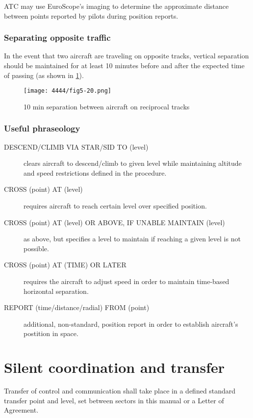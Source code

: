 ATC may use EuroScope's imaging to determine the approximate distance between
points reported by pilots during position reports.

\subsubsection{Separating opposite traffic}

In the event that two aircraft are traveling on opposite tracks, vertical
separation should be maintained for at least 10 minutes before and after the
expected time of passing (as shown in \cref{fig:separation:opposite}).

\begin{figure}[htbp]
  \centering
  \texttt{[image: 4444/fig5-20.png]}
  \caption{10 min separation between aircraft on reciprocal tracks~\cite{4444}}
  \label{fig:separation:opposite}
\end{figure}

\subsubsection{Useful phraseology}

\begin{description}
\item[DESCEND/CLIMB VIA STAR/SID TO (level)] clears aircraft to descend/climb to
  given level while maintaining altitude and speed restrictions defined in the
  procedure.
\item[CROSS (point) AT (level)] requires aircraft to reach certain level over
  specified position.
\item[CROSS (point) AT (level) OR ABOVE, IF UNABLE MAINTAIN (level)] as above,
  but specifies a level to maintain if reaching a given level is not possible.
\item[CROSS (point) AT (TIME) OR LATER] requires the aircraft to adjust speed in
  order to maintain time-based horizontal separation.
\item[REPORT (time/distance/radial) FROM (point)] additional, non-standard,
  position report in order to establish aircraft's postition in space.
\end{description}

\section{Silent coordination and transfer}

Transfer of control and communication shall take place in a defined standard
transfer point and level, set between sectors in this manual or a Letter of
Agreement.

